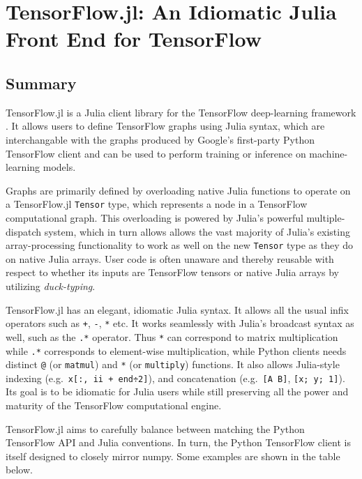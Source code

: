 \documentclass{book}
\begin{document}
\chapter{TensorFlow.jl: An Idiomatic Julia Front End for TensorFlow}

\section{Summary}

TensorFlow.jl is a Julia \citep{Julia} client library for the
TensorFlow deep-learning framework
\citep{tensorflow2015-whitepaper,tensorflow2016}. It allows users to define
TensorFlow graphs using Julia syntax, which are interchangable with the
graphs produced by Google's first-party Python TensorFlow client and can
be used to perform training or inference on machine-learning models.

Graphs are primarily defined by overloading native Julia functions to
operate on a TensorFlow.jl \texttt{Tensor} type, which represents a node
in a TensorFlow computational graph. This overloading is powered by
Julia's powerful multiple-dispatch system, which in turn allows allows
the vast majority of Julia's existing array-processing functionality to
work as well on the new \texttt{Tensor} type as they do on native Julia
arrays. User code is often unaware and thereby reusable with respect to
whether its inputs are TensorFlow tensors or native Julia arrays by
utilizing \emph{duck-typing}.

TensorFlow.jl has an elegant, idiomatic Julia syntax. It allows all the
usual infix operators such as \texttt{+}, \texttt{-}, \texttt{*} etc. It
works seamlessly with Julia's broadcast syntax as well, such as the
\texttt{.*} operator. Thus \texttt{*} can correspond to matrix
multiplication while \texttt{.*} corresponds to element-wise
multiplication, while Python clients needs distinct \texttt{@} (or
\texttt{matmul}) and \texttt{*} (or \texttt{multiply}) functions. It
also allows Julia-style indexing
(e.g.~\texttt{x{[}:,\ ii\ +\ end÷2{]}}), and concatenation
(e.g.~\texttt{{[}A\ B{]}}, \texttt{{[}x;\ y;\ 1{]}}). Its goal is to be
idiomatic for Julia users while still preserving all the power and
maturity of the TensorFlow computational engine.

TensorFlow.jl aims to carefully balance between matching the Python
TensorFlow API and Julia conventions. In turn, the Python TensorFlow
client is itself designed to closely mirror numpy. Some examples are
shown in the table below.
\end{document}
